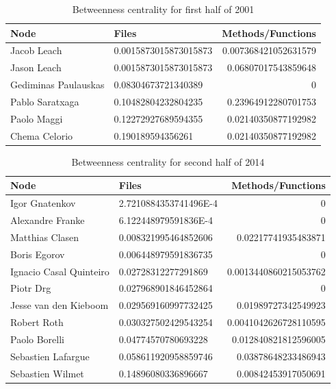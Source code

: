\documentclass[a4paper]{article}
\begin{document}
\begin{table}[ht]
\begin{center}
\caption{Betweenness centrality for first half of 2001}
\label{tab:2001}
\bigskip
\begin{tabular}{|l|l|r|}
\hline
Node & Files & Methods/Functions \\ \hline
Jacob Leach & 0.0015873015873015873 & 0.007368421052631579\\
Jason Leach & 0.0015873015873015873 & 0.06807017543859648\\
Gediminas Paulauskas & 0.08304673721340389 & 0\\
Pablo Saratxaga & 0.10482804232804235 & 0.23964912280701753\\
Paolo Maggi & 0.12272927689594355 & 0.02140350877192982\\
Chema Celorio & 0.190189594356261 & 0.02140350877192982\\ \hline
\end{tabular}
\end{center}
\end{table}

\begin{table}[ht]
\begin{center}
\caption{Betweenness centrality for second half of 2014}
\bigskip
\label{tab:2014}
\begin{tabular}{|l|l|r|}
\hline
Node & Files & Methods/Functions \\ \hline
Igor Gnatenkov & 2.7210884353741496E-4 & 0\\
Alexandre Franke & 6.122448979591836E-4 & 0\\
Matthias Clasen & 0.008321995464852606 & 0.02217741935483871\\
Boris Egorov & 0.006448979591836735 & 0\\
Ignacio Casal Quinteiro & 0.02728312277291869 & 0.0013440860215053762\\
Piotr Drg & 0.027968901846452864 & 0\\
Jesse van den Kieboom & 0.029569160997732425 & 0.01989727342549923\\
Robert Roth & 0.030327502429543254 & 0.0041042626728110595\\
Paolo Borelli & 0.04774570780693228 & 0.012840821812596005\\
Sebastien Lafargue & 0.058611920958859746 & 0.03878648233486943\\
Sebastien Wilmet & 0.14896080336896667 & 0.00842453917050691\\ \hline
\end{tabular}
\end{center}
\end{table}
\end{document}

